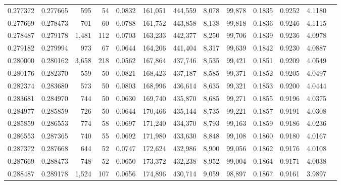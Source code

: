 \begin{tabular}{rrrrrrrrrrrrr}
0.277372 & 0.277665 &   595 &  54 &                                     0.0832 & 161,051 & 444,559 &   8,078 &  99,878 & 0.1835 & 0.9252 & 4.1180 \\
0.277669 & 0.278473 &   701 &  60 &                                     0.0788 & 161,752 & 443,858 &   8,138 &  99,818 & 0.1836 & 0.9246 & 4.1115 \\
0.278487 & 0.279178 & 1,481 & 112 &                                     0.0703 & 163,233 & 442,377 &   8,250 &  99,706 & 0.1839 & 0.9236 & 4.0978 \\
0.279182 & 0.279994 &   973 &  67 &                                     0.0644 & 164,206 & 441,404 &   8,317 &  99,639 & 0.1842 & 0.9230 & 4.0887 \\
0.280000 & 0.280162 & 3,658 & 218 &                                     0.0562 & 167,864 & 437,746 &   8,535 &  99,421 & 0.1851 & 0.9209 & 4.0549 \\
0.280176 & 0.282370 &   559 &  50 &                                     0.0821 & 168,423 & 437,187 &   8,585 &  99,371 & 0.1852 & 0.9205 & 4.0497 \\
0.282374 & 0.283680 &   573 &  50 &                                     0.0803 & 168,996 & 436,614 &   8,635 &  99,321 & 0.1853 & 0.9200 & 4.0444 \\
0.283681 & 0.284970 &   744 &  50 &                                     0.0630 & 169,740 & 435,870 &   8,685 &  99,271 & 0.1855 & 0.9196 & 4.0375 \\
0.284977 & 0.285859 &   726 &  50 &                                     0.0644 & 170,466 & 435,144 &   8,735 &  99,221 & 0.1857 & 0.9191 & 4.0308 \\
0.285859 & 0.286553 &   774 &  58 &                                     0.0697 & 171,240 & 434,370 &   8,793 &  99,163 & 0.1859 & 0.9186 & 4.0236 \\
0.286553 & 0.287365 &   740 &  55 &                                     0.0692 & 171,980 & 433,630 &   8,848 &  99,108 & 0.1860 & 0.9180 & 4.0167 \\
0.287372 & 0.287668 &   644 &  52 &                                     0.0747 & 172,624 & 432,986 &   8,900 &  99,056 & 0.1862 & 0.9176 & 4.0108 \\
0.287669 & 0.288473 &   748 &  52 &                                     0.0650 & 173,372 & 432,238 &   8,952 &  99,004 & 0.1864 & 0.9171 & 4.0038 \\
0.288487 & 0.289178 & 1,524 & 107 &                                     0.0656 & 174,896 & 430,714 &   9,059 &  98,897 & 0.1867 & 0.9161 & 3.9897 \\

\end{tabular}
